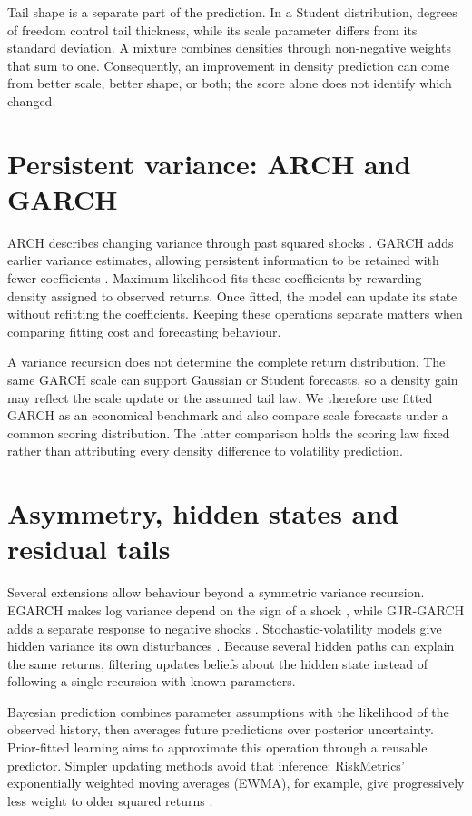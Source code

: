 Tail shape is a separate part of the prediction. In a Student distribution, degrees of freedom control tail thickness, while its scale parameter differs from its standard deviation. A mixture combines densities through non-negative weights that sum to one. Consequently, an improvement in density prediction can come from better scale, better shape, or both; the score alone does not identify which changed.

\section{Persistent variance: ARCH and GARCH}

ARCH describes changing variance through past squared shocks \citep{engle1982arch}. GARCH adds earlier variance estimates, allowing persistent information to be retained with fewer coefficients \citep{bollerslev1986generalized}. Maximum likelihood fits these coefficients by rewarding density assigned to observed returns. Once fitted, the model can update its state without refitting the coefficients. Keeping these operations separate matters when comparing fitting cost and forecasting behaviour.

A variance recursion does not determine the complete return distribution. The same GARCH scale can support Gaussian or Student forecasts, so a density gain may reflect the scale update or the assumed tail law. We therefore use fitted GARCH as an economical benchmark and also compare scale forecasts under a common scoring distribution. The latter comparison holds the scoring law fixed rather than attributing every density difference to volatility prediction.

\section{Asymmetry, hidden states and residual tails}

Several extensions allow behaviour beyond a symmetric variance recursion. EGARCH makes log variance depend on the sign of a shock \citep{nelson1991conditional}, while GJR-GARCH adds a separate response to negative shocks \citep{glosten1993relation}. Stochastic-volatility models give hidden variance its own disturbances \citep{harvey1994multivariate}. Because several hidden paths can explain the same returns, filtering updates beliefs about the hidden state instead of following a single recursion with known parameters.

Bayesian prediction combines parameter assumptions with the likelihood of the observed history, then averages future predictions over posterior uncertainty. Prior-fitted learning aims to approximate this operation through a reusable predictor. Simpler updating methods avoid that inference: RiskMetrics' exponentially weighted moving averages (EWMA), for example, give progressively less weight to older squared returns \citep{riskmetrics1996}.

